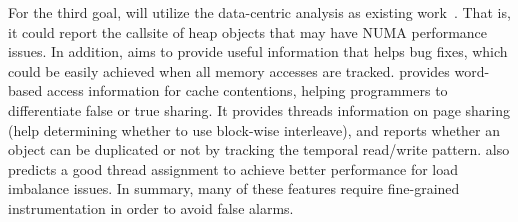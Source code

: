 

For the third goal, \NP{} will utilize the data-centric analysis as existing work~\cite{XuNuma}. That is, it could report the callsite of heap objects that may have NUMA performance issues. 
In addition, \NP{} aims to provide useful information that helps bug fixes, which could be easily achieved when all memory accesses are tracked. \NP{} provides word-based access information for cache contentions, helping programmers to differentiate false or true sharing. It provides threads information on page sharing (help determining whether to use block-wise interleave), and reports whether an object can be duplicated or not by tracking the temporal read/write pattern.
\NP{} also predicts a good thread assignment to achieve better performance for load imbalance issues. In summary, many of these features require fine-grained instrumentation in order to avoid false alarms. 


